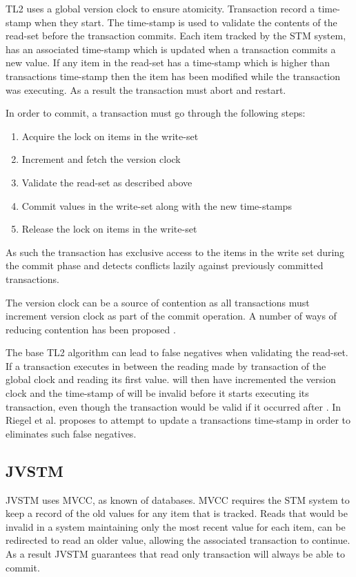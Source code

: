 TL2 uses a global version clock to ensure atomicity\cite[p. 201]{dice2006transactional}. Transaction record a time-stamp when they start. The time-stamp is used to validate the contents of the read-set before the transaction commits. Each item tracked by the \ac{STM} system, has an associated time-stamp which is updated when a transaction commits a new value. If any item in the read-set has a time-stamp which is higher than transactions time-stamp then the item has been modified while the transaction was executing. As a result the transaction must abort and restart.

In order to commit, a transaction must go through the following steps\cite[p. 200]{dice2006transactional}:
\begin{enumerate}
\item Acquire the lock on items in the write-set
\item Increment and fetch the version clock
\item Validate the read-set as described above
\item Commit values in the write-set along with the new time-stamps
\item Release the lock on items in the write-set
\end{enumerate}
As such the transaction has exclusive access to the items in the write set during the commit phase and detects conflicts lazily against previously committed transactions. 

The version clock can be a source of contention as all transactions must increment version clock as part of the commit operation\cite[p. 120]{harris2010transactional}. A number of ways of reducing contention has been proposed \cite{zhang2008commit}\cite{lev2009anatomy}\cite{avni2008maintaining}.

The base TL2 algorithm can lead to false negatives when validating the read-set. If a transaction  executes in between the reading made by transaction  of the global clock and reading its first value. will then have incremented the version clock and the time-stamp of  will be invalid before it starts executing its transaction, even though the transaction would be valid if it occurred after . In \cite{riegel2007time} Riegel et al. proposes to attempt to update a transactions time-stamp in order to eliminates such false negatives.

\subsection{JVSTM}
JVSTM uses \ac{MVCC}\cite[p. 1]{fernandes2011lock}, as known of databases\cite[p. 791]{elmasri2011fundamentals}. \ac{MVCC} requires the \ac{STM} system to keep a record of the old values for any item that is tracked\cite[p. 791]{elmasri2011fundamentals}. Reads that would be invalid in a system maintaining only the most recent value for each item, can be redirected to read an older value, allowing the associated transaction to continue\cite[p. 791]{elmasri2011fundamentals}. As a result JVSTM guarantees that read only transaction will always be able to commit\cite[p. 97]{cachopo2007development}.

